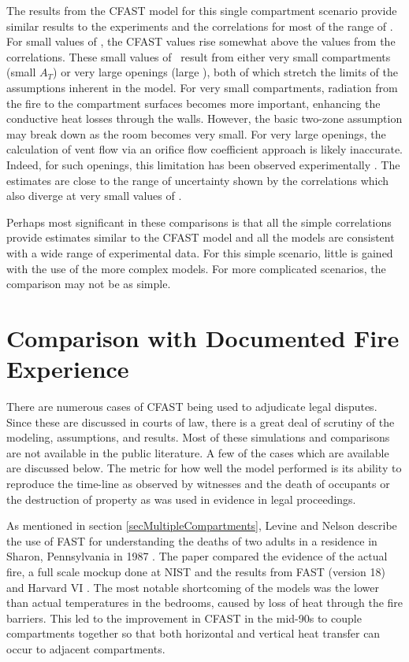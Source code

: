The results from the CFAST model for this single compartment scenario provide similar results
to the experiments and the correlations for most of the range of \asqh. For small values of \asqh, the CFAST values rise somewhat above the values from the correlations. These small values of \asqh \, result from either very small compartments (small $A_T$) or very large openings (large \asqh), both of which stretch the limits of the assumptions inherent in the model. For very small compartments, radiation from the fire to the compartment surfaces becomes more important, enhancing the conductive heat losses through the walls. However, the basic two-zone assumption may break down as the room becomes very small. For very large openings, the calculation of vent flow via an orifice flow coefficient approach is likely inaccurate. Indeed, for such openings, this limitation has been observed experimentally \cite{Valid:Babrauskas_Flashover}. The estimates are close to the range of uncertainty shown by the correlations which also diverge at very small values of \asqh.

Perhaps most significant in these comparisons is that all the simple correlations provide estimates similar to the CFAST model and all the models are consistent with a wide range of experimental data. For this simple scenario, little is gained with the use of the more complex models. For more complicated scenarios, the comparison may not be as simple.

\section {Comparison with Documented Fire Experience}

There are numerous cases of CFAST being used to adjudicate legal disputes. Since these are discussed in courts of law, there is a great deal of scrutiny of the modeling, assumptions, and results. Most of these simulations and comparisons are not available in the public literature. A few of the cases which are available are discussed below. The metric for how well the model performed is its ability to reproduce the time-line as observed by witnesses and the death of occupants or the destruction of property as was used in evidence in legal proceedings.

As mentioned in section \ref{secMultipleCompartments}, Levine and Nelson describe the use of FAST for understanding the deaths of two adults in a residence in Sharon, Pennsylvania in 1987 \cite{Valid:Levine}. The paper compared the evidence of the actual fire, a full scale mockup done at NIST and the results from FAST (version 18) \cite{Jones:1985} and Harvard VI \cite{Rockett:1985}. The most notable shortcoming of the models was the lower than actual temperatures in the bedrooms, caused by loss of heat through the fire barriers. This led to the improvement in CFAST in the mid-90s to couple compartments together so that both horizontal and vertical heat transfer can occur to adjacent compartments.

